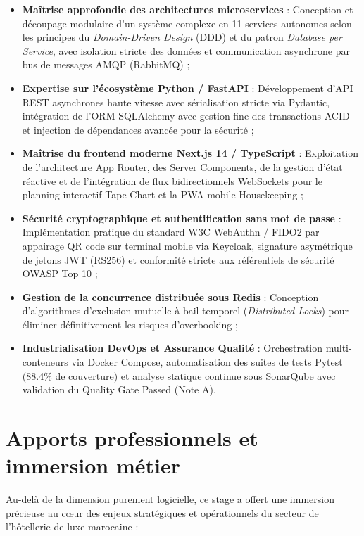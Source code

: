 \documentclass[12pt,a4paper,oneside]{report}
\begin{document}
\begin{itemize}
    \item \textbf{Maîtrise approfondie des architectures microservices} : Conception et découpage modulaire d'un système complexe en 11 services autonomes selon les principes du \textit{Domain-Driven Design} (DDD) et du patron \textit{Database per Service}, avec isolation stricte des données et communication asynchrone par bus de messages AMQP (RabbitMQ) ;
    \item \textbf{Expertise sur l'écosystème Python / FastAPI} : Développement d'API REST asynchrones haute vitesse avec sérialisation stricte via Pydantic, intégration de l'ORM SQLAlchemy avec gestion fine des transactions ACID et injection de dépendances avancée pour la sécurité ;
    \item \textbf{Maîtrise du frontend moderne Next.js 14 / TypeScript} : Exploitation de l'architecture App Router, des Server Components, de la gestion d'état réactive et de l'intégration de flux bidirectionnels WebSockets pour le planning interactif Tape Chart et la PWA mobile Housekeeping ;
    \item \textbf{Sécurité cryptographique et authentification sans mot de passe} : Implémentation pratique du standard W3C WebAuthn / FIDO2 par appairage QR code sur terminal mobile via Keycloak, signature asymétrique de jetons JWT (RS256) et conformité stricte aux référentiels de sécurité OWASP Top 10 ;
    \item \textbf{Gestion de la concurrence distribuée sous Redis} : Conception d'algorithmes d'exclusion mutuelle à bail temporel (\textit{Distributed Locks}) pour éliminer définitivement les risques d'overbooking ;
    \item \textbf{Industrialisation DevOps et Assurance Qualité} : Orchestration multi-conteneurs via Docker Compose, automatisation des suites de tests Pytest (88.4\% de couverture) et analyse statique continue sous SonarQube avec validation du Quality Gate Passed (Note A).
\end{itemize}

\section{Apports professionnels et immersion métier}

Au-delà de la dimension purement logicielle, ce stage a offert une immersion précieuse au cœur des enjeux stratégiques et opérationnels du secteur de l'hôtellerie de luxe marocaine :
\end{document}
